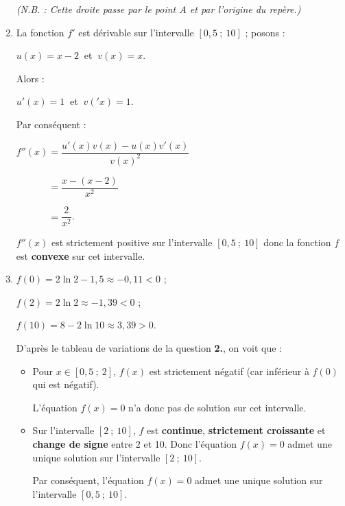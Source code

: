 \begin{corrige}
\begin{enumerate}
          \textit{(N.B. : Cette droite passe par le point $A$ et par l'origine du repère.)}
          \par
          \item %
          La fonction $f'$ est dérivable sur l'intervalle $[0,5~;~10]$ ; posons :
          \par
          $u(x)=x-2\ $ et $\ v(x)=x.$
          \par
          Alors :
          \par
          $u'(x)=1\ $ et $\ v('x)=1$.
          \par
          Par conséquent :
          \par
          $f''(x)=\dfrac{u'(x)v(x)-u(x)v'(x)}{v(x)^2}$
          \par
          $\phantom{f''(x)}=\dfrac{x-(x-2)}{x^2}$
          \par
          $\phantom{f''(x)}=\dfrac{2}{x^2}$.
          \par
          $f''(x)$ est strictement positive  sur l'intervalle $[0,5~;~10]$ donc la fonction $f$ est \textbf{convexe} sur cet intervalle.
          \item %
          $f(0)=2\ln2-1,5 \approx -0,11 < 0$ ;
          \par
          $f(2)=2\ln2 \approx -1,39 < 0$ ;
          \par
          $f(10)= 8-2\ln10 \approx 3,39 >0$.
          \par
          D'après le tableau de variations de la question \textbf{2.}, on voit que :
          \par
          \begin{itemize}
               \item
               Pour $x \in [0,5~;~2]$, $f(x)$ est strictement négatif (car inférieur à $f(0)$ qui est négatif).
               \par
               L'équation $f(x)=0$ n'a donc pas de solution sur cet intervalle.
               \item
               Sur l'intervalle $[2~;~10]$, $f$ est \textbf{continue}, \textbf{strictement croissante} et \textbf{change de signe} entre 2 et 10. Donc l'équation $f(x)=0$ admet une unique solution sur l'intervalle $[2~;~10]$.
               \par
               Par conséquent, l'équation $f(x)=0$ admet une unique solution sur l'intervalle $[0,5~;~10]$.

\end{itemize}
\end{enumerate}
\end{corrige}
